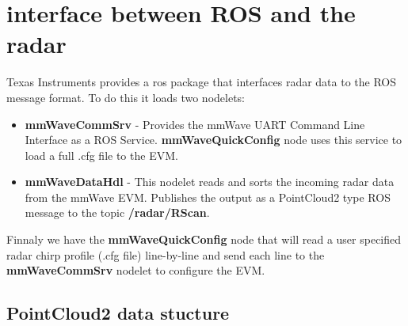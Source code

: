 \documentclass[12pt]{article}
\begin{document}
\section{interface between ROS and the radar}
Texas Instruments provides a ros package that interfaces radar data to the ROS message format.
To do this it loads two nodelets:
\begin{itemize}
\item \textbf{mmWaveCommSrv} - Provides the mmWave UART Command Line Interface as a ROS Service. \textbf{mmWaveQuickConfig} node uses this service to load a full .cfg file to the EVM.
\item \textbf{mmWaveDataHdl} - This nodelet reads and sorts the incoming radar data from the mmWave EVM. Publishes the output as a PointCloud2 type ROS message to the topic \textbf{/radar/RScan}.
\end{itemize}

Finnaly we have the \textbf{mmWaveQuickConfig} node that will read a user specified radar chirp profile (.cfg file) line-by-line and send each line to the \textbf{mmWaveCommSrv} nodelet to configure the EVM.
\
\subsection{PointCloud2 data stucture}
\end{document}
